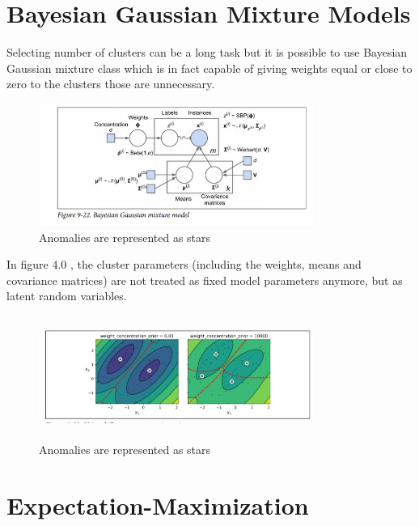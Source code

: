 \documentclass[conference]{IEEEtran}
\begin{document}
\section{Bayesian Gaussian Mixture Models}

Selecting number of clusters can be a long task but it is possible to use Bayesian Gaussian mixture class which is in fact capable of giving weights equal or close to zero to the clusters those are unnecessary. 

\begin{figure}[h]
    \centering
    \includegraphics[width=9cm,height=4cm]{anamolytwo.JPG}
    \caption{Anomalies are represented as stars}
    \label{}
\end{figure}

In figure 4.0 , the cluster parameters (including the weights, means and covariance
matrices) are not treated as fixed model parameters anymore, but as latent random
variables. \\

\begin{figure}[h]
    \centering
    \includegraphics[width=9cm,height=4cm]{anamolythree.JPG}
    \caption{Anomalies are represented as stars}
    \label{}
\end{figure}
\section{Expectation-Maximization}
\end{document}
